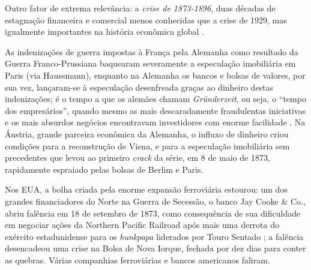 Outro fator de extrema relevância: a \textit{crise de 1873-1896}, duas décadas de estagnação financeira e comercial menos conhecidas que a crise de 1929, mas igualmente importantes na história econômica global \cite{Fels1949,Fels1951,hobsbawm_empire_1989,Musson1959,Rezneck1950,Sprague1910,Persons1920}. 

As indenizações de guerra impostas à França pela Alemanha como resultado da Guerra Franco-Prussiana baquearam severamente a especulação imobiliária em Paris (via Haussmann), enquanto na Alemanha os bancos e bolsas de valores, por sua vez, lançaram-se à especulação desenfreada graças ao dinheiro destas indenizações; é o tempo a que os alemães chamam \textit{Gründerzeit}, ou seja, o ``tempo dos empresários'', quando mesmo as mais descaradamente fraudulentas iniciativas e os mais absurdos negócios encontravam investidores com enorme facilidade \cite[p.~61]{hobsbawm_capital_1977}. Na Áustria, grande parceira econômica da Alemanha, o influxo de dinheiro criou condições para a reconstrução de Viena, e para a especulação imobiliária sem precedentes que levou ao primeiro \textit{crack} da série, em 8 de maio de 1873, rapidamente espraiado pelas bolsas de Berlim e Paris.

Nos EUA, a bolha criada pela enorme expansão ferroviária estourou: um dos grandes financiadores do Norte na Guerra de Secessão, o banco Jay Cooke \& Co., abriu falência em 18 de setembro de 1873, como consequência de sua dificuldade em negociar ações da Northern Pacific Railroad após mais uma derrota do exército estadunidense para os \textit{hunkpapa} liderados por Touro Sentado \cite[p.~241-242]{utley_frontier_1973}; a falência desencadeou uma crise na Bolsa de Nova Iorque, fechada por dez dias para conter as quebras. Várias companhias ferroviárias e bancos americanos faliram. 

